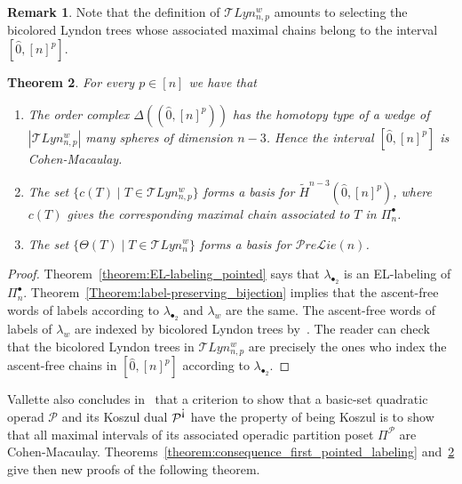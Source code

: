 \documentclass[11pt]{article}
\newtheorem{theo}{Theorem}[section]
\theoremstyle{definition}
\newtheorem{rema}[theo]{Remark}
\numberwithin{equation}{section}
\newcommand{\antiexcl}{\rotatebox[origin=c]{180}{!}}
\newcommand{\OP}{\mathcal{P}}
\begin{document}
     \begin{rema}
         Note that the definition of $\mathcal{T}Lyn_{n,p}^{w}$ amounts to selecting the bicolored Lyndon trees whose associated maximal chains belong to the interval $[\hat{0},[n]^p]$.
     \end{rema}
    
\begin{theo}\label{theorem:consequence_second_pointed_labeling} 
  For every $p\in [n]$ we have that
 \begin{enumerate}
   \item   The order complex $\Delta((\hat{0},[n]^p))$ has the homotopy type of a wedge of $|\mathcal{T}Lyn_{n,p}^{w}|$  many spheres of dimension $n-3$. Hence the interval $[\hat{0},[n]^p]$ is Cohen-Macaulay.

\item The set
$ \{c(T) \mid T\in \mathcal{T}Lyn_{n,p}^{w}\}$ forms a basis for $\widetilde H^{n-3}(\hat{0},[n]^p)$, where $c(T)$ gives the corresponding maximal chain associated to $T$ in $\Pi_n^{\bullet}$.

\item The set
$\{\Theta(T) \mid T\in \mathcal{T}Lyn_{n}^{w}\}$ forms a basis for $\mathcal{P}re\mathcal{L}ie(n)$.
 \end{enumerate}
\end{theo}

\begin{proof}
Theorem~\ref{theorem:EL-labeling_pointed} says that  $\lambda_{\bullet_2}$ is an EL-labeling of $\Pi_n^{\bullet}$. Theorem~\ref{Theorem:label-preserving_bijection} implies that the ascent-free words of labels according to $\lambda_{\bullet_2}$ and $\lambda_{w}$ are the same. The ascent-free words of labels of $\lambda_{w}$ are indexed by bicolored Lyndon trees by~\cite[Theorem 5.7]{GonzalezDleonWachs2016}. The reader can check that the bicolored Lyndon trees in $\mathcal{T}Lyn_{n,p}^{w}$ are precisely the ones who index the ascent-free chains in $[\hat{0},[n]^p]$ according to $\lambda_{\bullet_2}$.
\end{proof}

Vallette also concludes in~\cite[Theorem 9]{Vallette2007} that a criterion to show that a basic-set quadratic operad $\OP$ and its Koszul dual $\OP^{\antiexcl}$ have the property of being Koszul is to show that all maximal intervals of its associated operadic partition poset $\Pi^{\OP}$ are Cohen-Macaulay. Theorems~\ref{theorem:consequence_first_pointed_labeling} and~\ref{theorem:consequence_second_pointed_labeling} give then new proofs of the following theorem.
\end{document}

